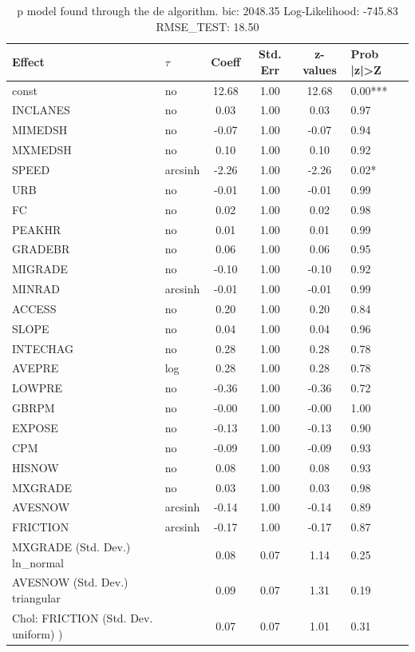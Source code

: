 \begin{table}
	\caption{p model found through the de algorithm. bic: 2048.35 Log-Likelihood: -745.83 RMSE_TEST: 18.50}
	\begin{center}
		\begin{tabular}{|l|l|c|c|c|l|}
			\hline
			Effect & $\tau$ & Coeff & Std. Err & z-values & Prob |z|>Z \\
			\hline
			const & no & 12.68 & 1.00 & 12.68 & 0.00*** \\
			\hline
			INCLANES & no & 0.03 & 1.00 & 0.03 & 0.97 \\
			\hline
			MIMEDSH & no & -0.07 & 1.00 & -0.07 & 0.94 \\
			\hline
			MXMEDSH & no & 0.10 & 1.00 & 0.10 & 0.92 \\
			\hline
			SPEED & arcsinh & -2.26 & 1.00 & -2.26 & 0.02* \\
			\hline
			URB & no & -0.01 & 1.00 & -0.01 & 0.99 \\
			\hline
			FC & no & 0.02 & 1.00 & 0.02 & 0.98 \\
			\hline
			PEAKHR & no & 0.01 & 1.00 & 0.01 & 0.99 \\
			\hline
			GRADEBR & no & 0.06 & 1.00 & 0.06 & 0.95 \\
			\hline
			MIGRADE & no & -0.10 & 1.00 & -0.10 & 0.92 \\
			\hline
			MINRAD & arcsinh & -0.01 & 1.00 & -0.01 & 0.99 \\
			\hline
			ACCESS & no & 0.20 & 1.00 & 0.20 & 0.84 \\
			\hline
			SLOPE & no & 0.04 & 1.00 & 0.04 & 0.96 \\
			\hline
			INTECHAG & no & 0.28 & 1.00 & 0.28 & 0.78 \\
			\hline
			AVEPRE & log & 0.28 & 1.00 & 0.28 & 0.78 \\
			\hline
			LOWPRE & no & -0.36 & 1.00 & -0.36 & 0.72 \\
			\hline
			GBRPM & no & -0.00 & 1.00 & -0.00 & 1.00 \\
			\hline
			EXPOSE & no & -0.13 & 1.00 & -0.13 & 0.90 \\
			\hline
			CPM & no & -0.09 & 1.00 & -0.09 & 0.93 \\
			\hline
			HISNOW & no & 0.08 & 1.00 & 0.08 & 0.93 \\
			\hline
			MXGRADE & no & 0.03 & 1.00 & 0.03 & 0.98 \\
			\hline
			AVESNOW & arcsinh & -0.14 & 1.00 & -0.14 & 0.89 \\
			\hline
			FRICTION & arcsinh & -0.17 & 1.00 & -0.17 & 0.87 \\
			\hline
			MXGRADE (Std. Dev.) ln_normal &  & 0.08 & 0.07 & 1.14 & 0.25 \\
			\hline
			AVESNOW (Std. Dev.) triangular &  & 0.09 & 0.07 & 1.31 & 0.19 \\
			\hline
			 Chol: FRICTION (Std. Dev. uniform) ) &  & 0.07 & 0.07 & 1.01 & 0.31 \\
			\hline
		\end{tabular}
	\end{center}
\end{table}